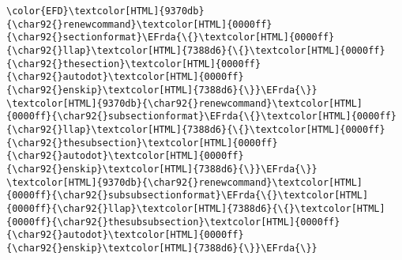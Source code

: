 \documentclass{article}
\newcommand{\EFrda}[1]{\textcolor{EFrda}{#1}} %
\begin{document}
\begin{Code}
\begin{Verbatim}
\color{EFD}\textcolor[HTML]{9370db}{\char92{}renewcommand}\textcolor[HTML]{0000ff}{\char92{}sectionformat}\EFrda{\{}\textcolor[HTML]{0000ff}{\char92{}llap}\textcolor[HTML]{7388d6}{\{}\textcolor[HTML]{0000ff}{\char92{}thesection}\textcolor[HTML]{0000ff}{\char92{}autodot}\textcolor[HTML]{0000ff}{\char92{}enskip}\textcolor[HTML]{7388d6}{\}}\EFrda{\}}
\textcolor[HTML]{9370db}{\char92{}renewcommand}\textcolor[HTML]{0000ff}{\char92{}subsectionformat}\EFrda{\{}\textcolor[HTML]{0000ff}{\char92{}llap}\textcolor[HTML]{7388d6}{\{}\textcolor[HTML]{0000ff}{\char92{}thesubsection}\textcolor[HTML]{0000ff}{\char92{}autodot}\textcolor[HTML]{0000ff}{\char92{}enskip}\textcolor[HTML]{7388d6}{\}}\EFrda{\}}
\textcolor[HTML]{9370db}{\char92{}renewcommand}\textcolor[HTML]{0000ff}{\char92{}subsubsectionformat}\EFrda{\{}\textcolor[HTML]{0000ff}{\char92{}llap}\textcolor[HTML]{7388d6}{\{}\textcolor[HTML]{0000ff}{\char92{}thesubsubsection}\textcolor[HTML]{0000ff}{\char92{}autodot}\textcolor[HTML]{0000ff}{\char92{}enskip}\textcolor[HTML]{7388d6}{\}}\EFrda{\}}
\end{Verbatim}
\end{Code}
\end{document}
